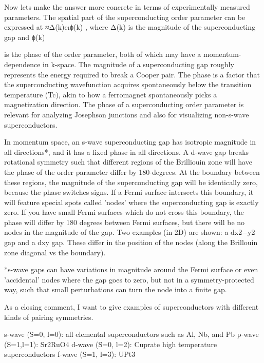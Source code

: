 \documentclass[a4paper,11pt]{article}
\begin{document}
Now lets make the answer more concrete in terms of experimentally measured parameters. The spatial part of the superconducting order parameter can be expressed at ≈Δ(k)eıϕ(k)
, where Δ(k) is the magnitude of the superconducting gap and ϕ(k)

is the phase of the order parameter, both of which may have a momentum-dependence in k-space. The magnitude of a superconducting gap roughly represents the energy required to break a Cooper pair. The phase is a factor that the superconducting wavefunction acquires spontaneously below the transition temperature (Tc), akin to how a ferromagnet spontaneously picks a magnetization direction. The phase of a superconducting order parameter is relevant for analyzing Josephson junctions and also for visualizing non-s-wave superconductors.

In momentum space, an s-wave superconducting gap has isotropic magnitude in all directions*, and it has a fixed phase in all directions. A d-wave gap breaks rotational symmetry such that different regions of the Brilliouin zone will have the phase of the order parameter differ by 180-degrees. At the boundary between these regions, the magnitude of the superconducting gap will be identically zero, because the phase switches signs. If a Fermi surface intersects this boundary, it will feature special spots called 'nodes' where the superconducting gap is exactly zero. If you have small Fermi surfaces which do not cross this boundary, the phase will differ by 180 degrees between Fermi surfaces, but there will be no nodes in the magnitude of the gap. Two examples (in 2D) are shown: a dx2−y2
gap and a dxy gap. These differ in the position of the nodes (along the Brillouin zone diagonal vs the boundary).

*s-wave gaps can have variations in magnitude around the Fermi surface or even 'accidental' nodes where the gap goes to zero, but not in a symmetry-protected way, such that small perturbations can turn the node into a finite gap.

As a closing comment, I want to give examples of superconductors with different kinds of pairing symmetries.

    s-wave (S=0, l=0): all elemental superconductors such as Al, Nb, and Pb
    p-wave (S=1,l=1): Sr2RuO4
    d-wave (S=0, l=2): Cuprate high temperature superconductors
    f-wave (S=1, l=3): UPt3
\end{document}
